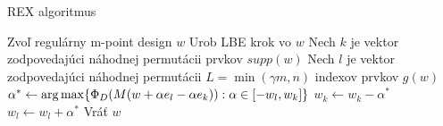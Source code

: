 \begin{algorithm}[H]
	\caption{REX algoritmus \cite{rex_harman}}
	\label{rex}
	\begin{algorithmic}[1]
		\State Zvoľ regulárny m-point design $w$
			\State Urob LBE krok vo $w$
			\State Nech $k$ je vektor zodpovedajúci náhodnej permutácii prvkov $supp(w)$
			\State Nech $l$ je vektor zodpovedajúci náhodnej permutácii $L=\min(\gamma m, n)$ indexov prvkov $g(w)$
					\State $\alpha^* \leftarrow \operatorname*{arg\,max} \{ \Phi_D (M(w+\alpha e_l -\alpha e_k)) : \alpha \in [-w_l, w_k] \}$
						\State $w_k \leftarrow w_k - \alpha^*$
						\State $w_l \leftarrow w_l + \alpha^*$
					\EndIf
				\EndFor
			\EndFor
		\EndWhile
		\State Vráť $w$
	\end{algorithmic}
\end{algorithm}


